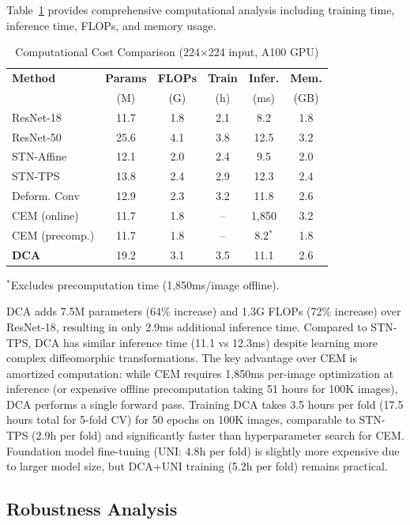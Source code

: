 \documentclass[final,3p,times,review,sort&compress]{elsarticle}
\begin{document}
Table~\ref{tab:computational} provides comprehensive computational analysis including training time, inference time, FLOPs, and memory usage.

\begin{table}[t]
\centering
\caption{Computational Cost Comparison (224$\times$224 input, A100 GPU)}
\label{tab:computational}
\begin{tabularx}{\textwidth}{Xccccc}
\hline
\textbf{Method} & \textbf{Params} & \textbf{FLOPs} & \textbf{Train} & \textbf{Infer.} & \textbf{Mem.} \\
 & (M) & (G) & (h) & (ms) & (GB) \\
\hline
ResNet-18 & 11.7 & 1.8 & 2.1 & 8.2 & 1.8 \\
ResNet-50 & 25.6 & 4.1 & 3.8 & 12.5 & 3.2 \\
STN-Affine & 12.1 & 2.0 & 2.4 & 9.5 & 2.0 \\
STN-TPS & 13.8 & 2.4 & 2.9 & 12.3 & 2.4 \\
Deform. Conv & 12.9 & 2.3 & 3.2 & 11.8 & 2.6 \\
CEM (online) & 11.7 & 1.8 & -- & 1,850 & 3.2 \\
CEM (precomp.) & 11.7 & 1.8 & -- & 8.2$^*$ & 1.8 \\
\textbf{DCA} & 19.2 & 3.1 & 3.5 & 11.1 & 2.6 \\
\hline
\end{tabularx}

\vspace{1mm}
\footnotesize{$^*$Excludes precomputation time (1,850ms/image offline).}
\end{table}

DCA adds 7.5M parameters (64\% increase) and 1.3G FLOPs (72\% increase) over ResNet-18, resulting in only 2.9ms additional inference time. Compared to STN-TPS, DCA has similar inference time (11.1 vs 12.3ms) despite learning more complex diffeomorphic transformations. The key advantage over CEM is amortized computation: while CEM requires 1,850ms per-image optimization at inference (or expensive offline precomputation taking 51 hours for 100K images), DCA performs a single forward pass. Training DCA takes 3.5 hours per fold (17.5 hours total for 5-fold CV) for 50 epochs on 100K images, comparable to STN-TPS (2.9h per fold) and significantly faster than hyperparameter search for CEM. Foundation model fine-tuning (UNI: 4.8h per fold) is slightly more expensive due to larger model size, but DCA+UNI training (5.2h per fold) remains practical.

\subsection{Robustness Analysis}
\end{document}
